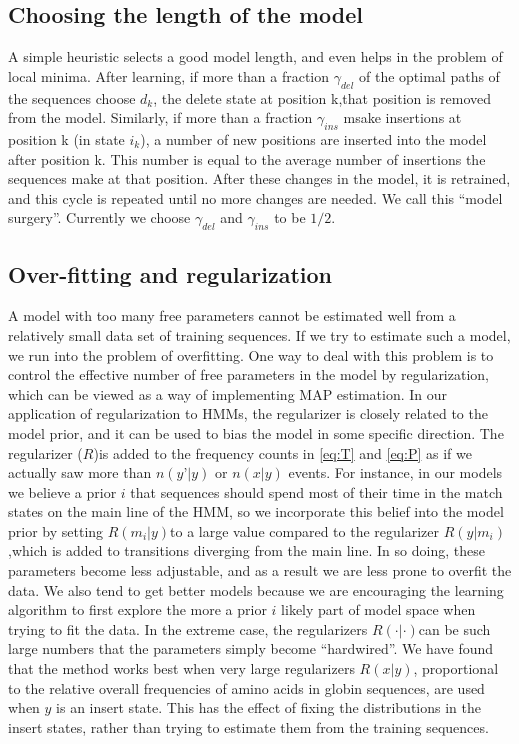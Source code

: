 \subsection{Choosing the length of the model}
A simple heuristic selects a good model length, and even helps in the problem of local minima.
After learning, if more than a fraction $\gamma_{del}$ of the optimal paths of the sequences choose $d_k$, the delete state at position k,that position is removed from the model.
Similarly, if more than a fraction $\gamma_{ins}$ msake insertions at position k (in state $i_k$), a number of new positions are inserted into the model after position k. This number is equal to the average number of insertions the sequences make at that position. After these changes in the model, it is retrained, and this cycle is repeated until no more changes are needed. We call this “model surgery”. Currently we choose $\gamma_{del}$ and $\gamma_{ins}$ to be $1/2$.

\subsection{Over-fitting and regularization}
A model with too many free parameters cannot be estimated well from a relatively small data set of training sequences. If we try to estimate such a model, we run into the problem of overfitting.
One way to deal with this problem is to control the effective number of free parameters in the model by regularization, which can be viewed as a way of implementing MAP estimation.
In our application of regularization to HMMs, the regularizer is closely related to the model prior, and it can be used to bias the model in some specific direction. The regularizer ($R$)is added to the frequency counts in \ref{eq:T} and  \ref{eq:P} as if we actually saw more than $n(y’|y)$ or $n(x|y)$ events.
For instance, in our models we believe a prior $i$ that sequences should spend most of their time in the match states on the main line of the HMM, so we incorporate this belief into the model prior by setting $R(m_i|y)$to a large value compared to the regularizer $R(y|m_i)$,which is added to transitions diverging from the main line.
In so doing, these parameters become less adjustable, and as a result we are less prone to overfit the data.
We also tend to get better models because we are encouraging the learning algorithm to first explore the more a prior $i$ likely part of model space when trying to fit the data.
In the extreme case, the regularizers $R(\cdot | \cdot)$can be such large numbers that the parameters simply become “hardwired”. We have found that the method works best when very large regularizers $R(x|y)$, proportional to the relative overall frequencies of amino acids in globin sequences, are used when $y$ is an insert state. This has the effect of fixing the distributions in the insert states, rather than trying to estimate them from the training sequences.

